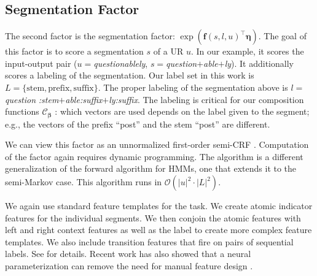 \documentclass[11pt,letterpaper]{article}
\newcommand{\word}[1]{{\em #1}}
\renewcommand{\vec}{\boldsymbol}
\newcommand{\vbeta}{{\vec{\beta}}}
\newcommand{\veta}{{\vec{\eta}}}
\newcommand{\vf}{{\vec{f}}}
\begin{document}
\subsection{Segmentation Factor}
The second factor is the segmentation factor: $\exp\left(\vf(s,
l,u)^{\top} \veta\right)$.  The goal of this factor is to score a
segmentation $s$ of a UR $u$. In our example, it scores the input-output pair ($u$$=$\word{questionablely},
$s$$=$\word{question}$+$\word{able}$+$\word{ly}). It additionally scores a
labeling of the segmentation. Our label set in this work is
$L = \{\text{stem}, \text{prefix}, \text{suffix}\}$.  The proper
labeling of the segmentation above is $l$$=$\word{question}{\em
  :stem}$+$\word{able}{\em :suffix}$+$\word{ly}{\em :suffix}.
The labeling is critical for our composition
functions $\mathcal{C}_{\vbeta}$ \cite{cotterell2015labeled}:
which vectors are used depends on the label given
to the segment; e.g., the vectors of the prefix ``post'' and the stem
``post'' are different.


We can view this factor as an unnormalized first-order semi-CRF
\cite{sarawagi2004semi}. Computation of the factor  again requires
dynamic programming.  The algorithm is a different
generalization of the forward algorithm for HMMs, one that extends it to the semi-Markov case.
This algorithm runs in $\mathcal{O}({|u|^2\cdot |L|^2})$. 

We again use standard feature templates for the task. We create
atomic indicator features for the individual segments. We then conjoin
the atomic features with left and right context features as well as
the label to create more complex feature templates. We also include
transition features that fire on pairs of sequential labels. See
 for  details.
Recent work has also showed that a neural parameterization
can remove the need for manual feature design \cite{kong2015segmental}.

\end{document}
